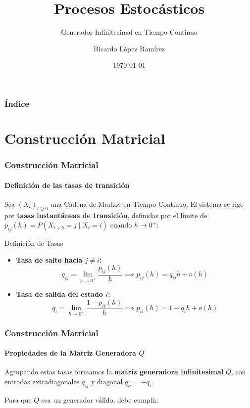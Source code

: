 \documentclass{beamer}
\title{Procesos Estocásticos}
\subtitle{Generador Infinitesimal en Tiempo Continuo}
\author{Ricardo López Ramírez}
\date{\today}
\institute{\url{423092556@pcpuma.acatlan.unam.com.mx}}
\begin{document}
\begin{frame}[plain,t]
\titlepage
\end{frame}

\begin{frame}
\frametitle{Índice}
\tableofcontents
\end{frame}


\section{Construcción Matricial}

\begin{frame}
\frametitle{Construcción Matricial}
\framesubtitle{Definición de las tasas de transición}

Sea $(X_t)_{t \ge 0}$ una Cadena de Markov en Tiempo Continuo. El sistema se rige por \textbf{tasas instantáneas de transición}, definidas por el límite de $p_{ij}(h) = P(X_{t+h} = j \mid X_t = i)$ cuando $h \to 0^+$:

\begin{block}{Definición de Tasas}
\small  
\begin{itemize}
    \item \textbf{Tasa de salto hacia $j \neq i$:}
    \[ q_{ij} = \lim_{h \to 0^+} \frac{p_{ij}(h)}{h} \implies p_{ij}(h) = q_{ij}h + o(h) \]
    
    \item \textbf{Tasa de salida del estado $i$:}
    \[ q_i = \lim_{h \to 0^+} \frac{1 - p_{ii}(h)}{h} \implies p_{ii}(h) = 1 - q_ih + o(h) \]
\end{itemize}
\end{block}

\end{frame}


\begin{frame}
\frametitle{Construcción Matricial}
\framesubtitle{Propiedades de la Matriz Generadora $Q$}

Agrupando estas tasas formamos la \textbf{matriz generadora infinitesimal} $Q$, con entradas extradiagonales $q_{ij}$ y diagonal $q_{ii} = -q_i$.

Para que $Q$ sea un generador válido, debe cumplir:

\end{frame}
\end{document}
